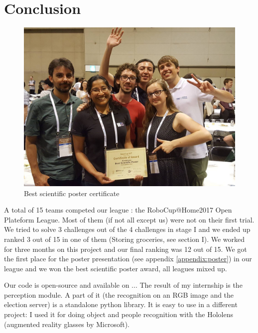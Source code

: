 \documentclass[a4paper, twocolumn]{article}
\begin{document}
    \section*{Conclusion}

    \begin{figure}[!b]
        \includegraphics[width=\columnwidth]{../img/certificate.jpg}
        \caption{Best scientific poster certificate}
        \label{certificate}
    \end{figure}

    A total of 15 teams competed our league : the RoboCup@Home2017 Open Plateform League. Most of them (if not all except us) were not on their first trial. We tried to solve 3 challenges out of the 4 challenges in stage I and we ended up ranked 3 out of 15 in one of them (Storing groceries, see section I). We worked for three months on this project and our final ranking was 12 out of 15. We got the first place for the poster presentation (see appendix \ref{appendix:poster}) in our league and we won the best scientific poster award, all leagues mixed up.

    Our code is open-source and available on ... The result of my internship is the perception module. A part of it (the recognition on an RGB image and the election server) is a standalone python library. It is easy to use in a different project: I used it for doing object and people recognition with the Hololens (augmented reality glasses by Microsoft).
\end{document}
